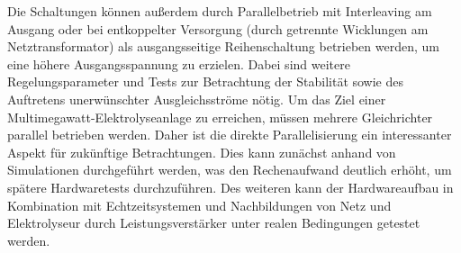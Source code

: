Die Schaltungen können außerdem durch Parallelbetrieb mit Interleaving am Ausgang oder bei entkoppelter Versorgung (durch getrennte Wicklungen am Netztransformator) als ausgangsseitige Reihenschaltung betrieben werden, um eine höhere Ausgangsspannung zu erzielen. Dabei sind weitere Regelungsparameter und Tests zur Betrachtung der Stabilität sowie des Auftretens unerwünschter Ausgleichsströme nötig. Um das Ziel einer Multimegawatt-Elektrolyseanlage zu erreichen, müssen mehrere Gleichrichter parallel betrieben werden. Daher ist die direkte Parallelisierung ein interessanter Aspekt für zukünftige Betrachtungen. Dies kann zunächst anhand von Simulationen durchgeführt werden, was den Rechenaufwand deutlich erhöht, um spätere Hardwaretests durchzuführen. Des weiteren kann der Hardwareaufbau in Kombination mit Echtzeitsystemen und Nachbildungen von Netz und Elektrolyseur durch Leistungsverstärker unter realen Bedingungen getestet werden. \\
